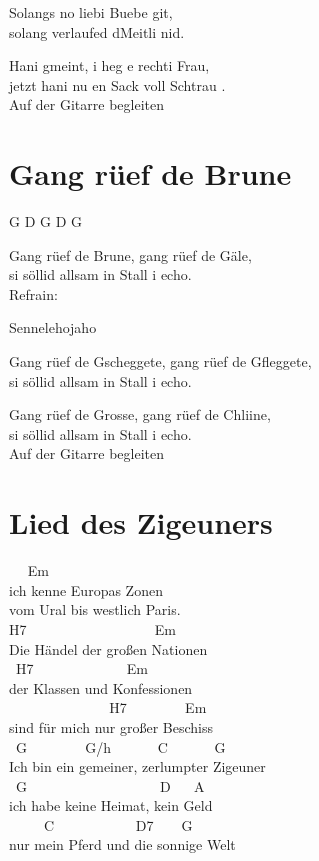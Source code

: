 \documentclass[
  letterpaper,
]{scrbook}
\begin{document}
Solangs no liebi Buebe git,\\
solang verlaufed d\textquotesingle Meitli nid.

Hani gmeint, i heg e rechti Frau,\\
jetzt hani nu en Sack voll Schtrau .\\
Auf der Gitarre begleiten

\hypertarget{gang-ruxfcef-de-brune}{%
\chapter{Gang rüef de Brune}\label{gang-ruxfcef-de-brune}}

G D G D G

Gang rüef de Brune, gang rüef de Gäle,\\
si söllid allsam in Stall i echo.\\
Refrain:

Sennelehojaho

Gang rüef de Gscheggete, gang rüef de Gfleggete,\\
si söllid allsam in Stall i echo.

Gang rüef de Grosse, gang rüef de Chliine,\\
si söllid allsam in Stall i echo.\\
Auf der Gitarre begleiten

\hypertarget{lied-des-zigeuners}{%
\chapter{Lied des Zigeuners}\label{lied-des-zigeuners}}

~ ~Em\\
ich kenne Europas Zonen\\
vom Ural bis westlich Paris.\\
H7 ~ ~ ~ ~ ~ ~ ~ ~ ~ ~ ~Em\\
Die Händel der großen Nationen\\
\hspace*{0.333em} ~H7 ~ ~ ~ ~ ~ ~ ~ ~Em\\
der Klassen und Konfessionen\\
\hspace*{0.333em} ~ ~ ~ ~ ~ ~ ~ ~ ~H7 ~ ~ ~ ~ ~Em ~\\
sind für mich nur großer Beschiss\\
\hspace*{0.333em} ~G ~ ~ ~ ~ ~G/h ~ ~ ~ ~C ~ ~ ~ ~G\\
Ich bin ein gemeiner, zerlumpter Zigeuner\\
\hspace*{0.333em} ~G ~ ~ ~ ~ ~ ~ ~ ~ ~ ~ ~ D ~ ~A\\
ich habe keine Heimat, kein Geld\\
\hspace*{0.333em} ~ ~ ~ C ~ ~ ~ ~ ~ ~ ~D7 ~ ~ G\\
nur mein Pferd und die sonnige Welt
\end{document}

